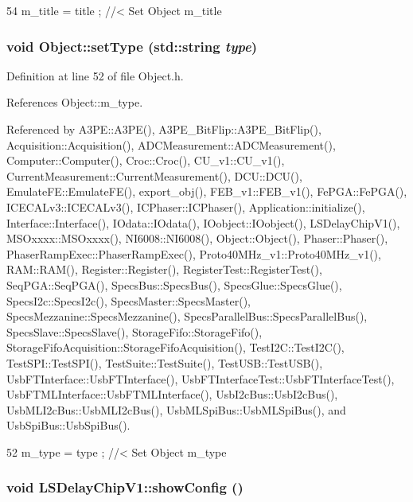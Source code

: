 \begin{DoxyCode}
54 { m_title = title ; } //< Set Object m_title
\end{DoxyCode}
\hypertarget{classObject_aae534cc9d982bcb9b99fd505f2e103a5}{
\subsubsection[{setType}]{\setlength{\rightskip}{0pt plus 5cm}void Object::setType (std::string {\em type})}}
\label{classObject_aae534cc9d982bcb9b99fd505f2e103a5}


Definition at line 52 of file Object.h.

References Object::m\_\-type.

Referenced by A3PE::A3PE(), A3PE\_\-BitFlip::A3PE\_\-BitFlip(), Acquisition::Acquisition(), ADCMeasurement::ADCMeasurement(), Computer::Computer(), Croc::Croc(), CU\_\-v1::CU\_\-v1(), CurrentMeasurement::CurrentMeasurement(), DCU::DCU(), EmulateFE::EmulateFE(), export\_\-obj(), FEB\_\-v1::FEB\_\-v1(), FePGA::FePGA(), ICECALv3::ICECALv3(), ICPhaser::ICPhaser(), Application::initialize(), Interface::Interface(), IOdata::IOdata(), IOobject::IOobject(), LSDelayChipV1(), MSOxxxx::MSOxxxx(), NI6008::NI6008(), Object::Object(), Phaser::Phaser(), PhaserRampExec::PhaserRampExec(), Proto40MHz\_\-v1::Proto40MHz\_\-v1(), RAM::RAM(), Register::Register(), RegisterTest::RegisterTest(), SeqPGA::SeqPGA(), SpecsBus::SpecsBus(), SpecsGlue::SpecsGlue(), SpecsI2c::SpecsI2c(), SpecsMaster::SpecsMaster(), SpecsMezzanine::SpecsMezzanine(), SpecsParallelBus::SpecsParallelBus(), SpecsSlave::SpecsSlave(), StorageFifo::StorageFifo(), StorageFifoAcquisition::StorageFifoAcquisition(), TestI2C::TestI2C(), TestSPI::TestSPI(), TestSuite::TestSuite(), TestUSB::TestUSB(), UsbFTInterface::UsbFTInterface(), UsbFTInterfaceTest::UsbFTInterfaceTest(), UsbFTMLInterface::UsbFTMLInterface(), UsbI2cBus::UsbI2cBus(), UsbMLI2cBus::UsbMLI2cBus(), UsbMLSpiBus::UsbMLSpiBus(), and UsbSpiBus::UsbSpiBus().


\begin{DoxyCode}
52 { m_type  = type  ; } //< Set Object m_type
\end{DoxyCode}
\hypertarget{classLSDelayChipV1_a01c1e85ae0d0e031164fe2d47b4f4824}{
\subsubsection[{showConfig}]{\setlength{\rightskip}{0pt plus 5cm}void LSDelayChipV1::showConfig ()}}
\label{classLSDelayChipV1_a01c1e85ae0d0e031164fe2d47b4f4824}


